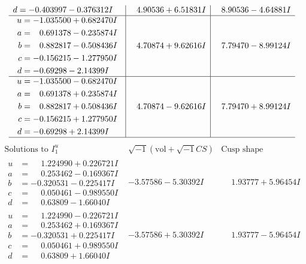 \documentclass[1p]{elsarticle_modified}
\theoremstyle{definition}
\newcommand{\I}{\sqrt{-1}}
\begin{document}
$$\begin{array}{c|c|c}
\begin{aligned}
d &= -0.403997 - 0.376312 I\end{aligned}
 & \phantom{-}4.90536 + 6.51831 I & \phantom{-}8.90536 - 4.64881 I \\ \hline\begin{aligned}
u &= -1.035500 + 0.682470 I \\
a &= \phantom{-}0.691378 - 0.235874 I \\
b &= \phantom{-}0.882817 - 0.508436 I \\
c &= -0.156215 - 1.277950 I \\
d &= -0.69298 - 2.14399 I\end{aligned}
 & \phantom{-}4.70874 + 9.62616 I & \phantom{-}7.79470 - 8.99124 I \\ \hline\begin{aligned}
u &= -1.035500 - 0.682470 I \\
a &= \phantom{-}0.691378 + 0.235874 I \\
b &= \phantom{-}0.882817 + 0.508436 I \\
c &= -0.156215 + 1.277950 I \\
d &= -0.69298 + 2.14399 I\end{aligned}
 & \phantom{-}4.70874 - 9.62616 I & \phantom{-}7.79470 + 8.99124 I\\
 \hline 
 \end{array}$$\newpage$$\begin{array}{c|c|c}  
\text{Solutions to }I^u_{1}& \I (\text{vol} + \sqrt{-1}CS) & \text{Cusp shape}\\
 \hline 
\begin{aligned}
u &= \phantom{-}1.224990 + 0.226721 I \\
a &= \phantom{-}0.253462 - 0.169367 I \\
b &= -0.320531 - 0.225417 I \\
c &= \phantom{-}0.050461 - 0.989550 I \\
d &= \phantom{-}0.63809 - 1.66040 I\end{aligned}
 & -3.57586 - 5.30392 I & \phantom{-}1.93777 + 5.96454 I \\ \hline\begin{aligned}
u &= \phantom{-}1.224990 - 0.226721 I \\
a &= \phantom{-}0.253462 + 0.169367 I \\
b &= -0.320531 + 0.225417 I \\
c &= \phantom{-}0.050461 + 0.989550 I \\
d &= \phantom{-}0.63809 + 1.66040 I\end{aligned}
 & -3.57586 + 5.30392 I & \phantom{-}1.93777 - 5.96454 I \\ \hline\begin{aligned}

\end{aligned}
\end{array}$$
\end{document}
